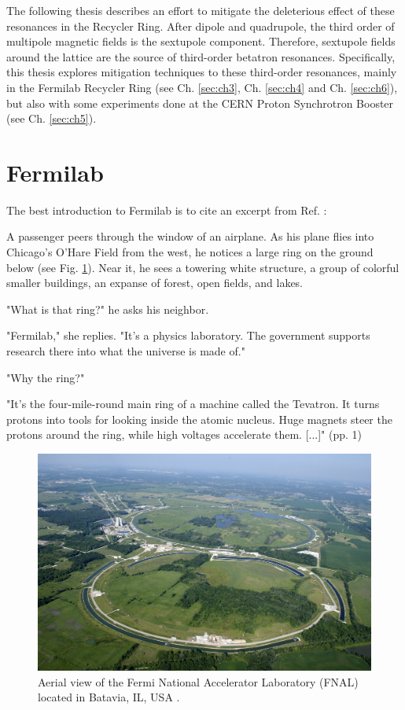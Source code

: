 The following thesis describes an effort to mitigate the deleterious effect of these resonances in the Recycler Ring. After dipole and quadrupole, the third order of multipole magnetic fields is the sextupole component. Therefore, sextupole fields around the lattice are the source of third-order betatron resonances. Specifically, this thesis explores mitigation techniques to these third-order resonances, mainly in the Fermilab Recycler Ring (see Ch. \ref{sec:ch3}, Ch. \ref{sec:ch4} and Ch. \ref{sec:ch6}), but also with some experiments done at the CERN Proton Synchrotron Booster (see Ch. \ref{sec:ch5}). 

\section{Fermilab}

The best introduction to Fermilab is to cite an excerpt from Ref. \cite{fermilab1}:
\begin{displayquote}
    \begin{flushleft}
    [...] A passenger peers through the window of an airplane. As his plane flies into Chicago's O'Hare Field from the west, he notices a large ring on the ground below (see Fig. \ref{fig:fermia}). Near it, he sees a towering white structure, a group of colorful smaller buildings, an expanse of forest, open fields, and lakes.

    "What is that ring?" he asks his neighbor.

    "Fermilab," she replies. "It's a physics laboratory. The government supports research there into what the universe is made of."

    "Why the ring?"

    "It's the four-mile-round main ring of a machine called the Tevatron. It turns protons into tools for looking inside the atomic nucleus. Huge magnets steer the protons around the ring, while high voltages accelerate them. [...]" (pp. 1)
    \end{flushleft}
\end{displayquote}

\begin{figure}[H]
    \centering
    \includegraphics[width=\columnwidth]{chapter1/fermilab.jpeg}
    \caption{Aerial view of the Fermi National Accelerator Laboratory (FNAL) located in Batavia, IL, USA \cite{fermipic}.}
    \label{fig:fermia}
 \end{figure}

